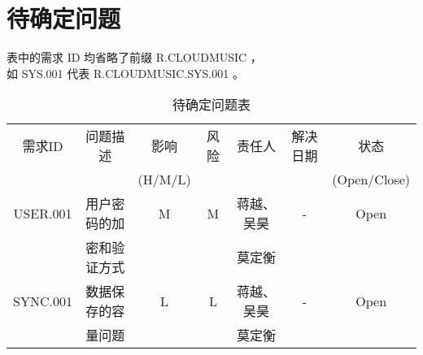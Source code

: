 \chapter{待确定问题}
表中的需求 ID 均省略了前缀 R.CLOUDMUSIC ，\\
    如 SYS.001 代表 R.CLOUDMUSIC.SYS.001 。
\begin{table}[htbp]
\centering
\caption{待确定问题表} \label{tab:tbd_problems}
\begin{tabular}{|c|c|c|c|c|c|c|}
    \hline
    需求ID & 问题描述 & 影响    & 风险 & 责任人 & 解决日期 & 状态 \\
           &          & (H/M/L) &      &        &          & (Open/Close) \\
    \hline
    USER.001 & 用户密码的加 & M & M & 蒋越、吴昊   & - & Open\\
             & 密和验证方式 &   &   & 莫定衡  &   &\\
    \hline
    SYNC.001 & 数据保存的容 & L & L & 蒋越、吴昊    & - & Open\\
             & 量问题       &   &   & 莫定衡  &   & \\
    \hline
\end{tabular}
\end{table}